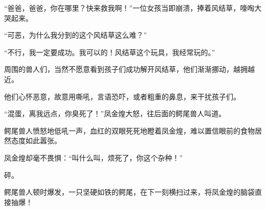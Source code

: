 \begin{this_body}
“爸爸，爸爸，你在哪里？快来救我啊！”一位女孩当即崩溃，捧着风结草，嚎啕大哭起来。

“可恶，为什么我分到的这个风结草这么难？”

“不行，我一定要成功。我可以的！风结草这个玩具，我经常玩的。”

周围的兽人们，当然不愿意看到孩子们成功解开风结草，他们渐渐挪动，越拥越近。

他们心怀恶意，故意用嘶吼，言语恐吓，或者粗重的鼻息，来干扰孩子们。

“混蛋，离我远点，你臭死了！”凤金煌大怒，往后面的鳄尾兽人叫道。

鳄尾兽人愤怒地低吼一声，血红的双眼死死地瞪着凤金煌，难以置信眼前的食物居然态度如此嚣张。

凤金煌却毫不畏惧：“叫什么叫，烦死了，你这个杂种！”

砰。

鳄尾兽人顿时爆发，一只坚硬如铁的鳄尾，在下一刻横扫过来，将凤金煌的脑袋直接抽爆！

\end{this_body}

